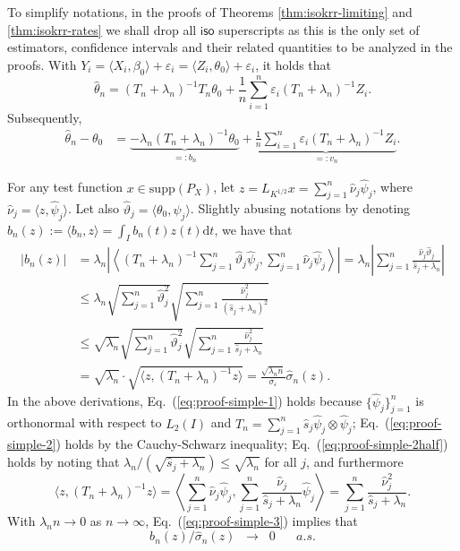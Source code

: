 \documentclass[aos]{imsart}
\renewcommand{\hat}{\widehat}
\newcommand{\supp}{\mathrm{supp}}
\newcommand{\ud}{\mathrm d}
\newcommand{\iso}{\mathsf{iso}}
\theoremstyle{plain}
\theoremstyle{definition}
\theoremstyle{definition}
\begin{document}
\begin{appendix}
To simplify notations, in the proofs of Theorems \ref{thm:isokrr-limiting} and \ref{thm:isokrr-rates} we shall drop all $\iso$ superscripts as this is the only set of estimators, confidence intervals and their related
quantities to be analyzed in the proofs.
With $Y_i=\langle X_i,\beta_0\rangle+\varepsilon_i = \langle Z_i,\theta_0\rangle+\varepsilon_i$, it holds that
$$
\hat\theta_n = (T_n+\lambda_n)^{-1}T_n\theta_0 + \frac{1}{n}\sum_{i=1}^n\varepsilon_i (T_n+\lambda_n)^{-1}Z_i.
$$
Subsequently,
\begin{align}
\hat\theta_n-\theta_0 &= \underbrace{-\lambda_n (T_n+\lambda_n)^{-1}\theta_0}_{=: b_n} + \underbrace{\frac{1}{n}\sum_{i=1}^n\varepsilon_i(T_n+\lambda_n)^{-1}Z_i}_{=:v_n}.
\end{align}

For any test function $x\in\supp(P_X)$, let $z=L_{K^{1/2}}x=\sum_{j=1}^{n}\hat\nu_j\hat\psi_j$, where $\hat\nu_j=\langle z,\hat\psi_j\rangle$.
Let also $\hat\vartheta_j = \langle\theta_0,\hat\psi_j\rangle$.
Slightly abusing notations by denoting $b_n(z) := \langle b_n,z\rangle = \int_I b_n(t)z(t)\ud t$, we have that
\begin{align}
\big|b_n(z)\big| &= \lambda_n\left|\left\langle(T_n+\lambda_n)^{-1}\sum_{j=1}^n\hat\vartheta_j\hat\psi_j, \sum_{j=1}^n\hat\nu_j\hat\psi_j\right\rangle\right|
= \lambda_n \left|\sum_{j=1}^n \frac{\hat\nu_j\hat\vartheta_j}{\hat s_j+\lambda_n}\right|\label{eq:proof-simple-1}\\
&\leq \lambda_n \sqrt{\sum_{j=1}^n\hat\vartheta_j^2}\sqrt{\sum_{j=1}^n\frac{\hat\nu_j^2}{(\hat s_j+\lambda_n)^2}} \label{eq:proof-simple-2}\\
&\leq \sqrt{\lambda_n}\sqrt{\sum_{j=1}^n\hat\vartheta_j^2}\sqrt{\sum_{j=1}^n\frac{\hat\nu_j^2}{\hat s_j+\lambda_n}}\label{eq:proof-simple-2half}\\
&= \sqrt{\lambda_n}\cdot \sqrt{\langle z,(T_n+\lambda_n)^{-1}z\rangle} = {\frac{\sqrt{\lambda_nn}}{\sigma_\varepsilon}\hat\sigma_n(z)}.\label{eq:proof-simple-3}
\end{align}
In the above derivations, Eq.~(\ref{eq:proof-simple-1}) holds because $\{\hat\psi_j\}_{j=1}^n$ is orthonormal with respect to $L_2(I)$ and $T_n=\sum_{j=1}^n\hat s_j\hat\psi_j\otimes\hat\psi_j$;
Eq.~(\ref{eq:proof-simple-2}) holds by the Cauchy-Schwarz inequality;
Eq.~(\ref{eq:proof-simple-2half}) holds by noting that $\lambda_n/(\sqrt{\hat s_j+\lambda_n})\leq\sqrt{\lambda_n}$ for all $j$, and furthermore
$$
\langle z, (T_n+\lambda_n)^{-1}z\rangle = \left\langle\sum_{j=1}^n\hat\nu_j\hat\psi_j, \sum_{j=1}^n\frac{\hat\nu_j}{\hat s_j+\lambda_n}\hat\psi_j\right\rangle = \sum_{j=1}^n\frac{\hat\nu_j^2}{\hat s_j+\lambda_n}.
$$
With $\lambda_n n\to 0$ as $n\to\infty$, Eq.~(\ref{eq:proof-simple-3}) implies that
$$
b_n(z)/\hat\sigma_n(z)\;\;\to\;\;0\;\;\;\;\;\;a.s.
$$


\end{appendix}
\end{document}
